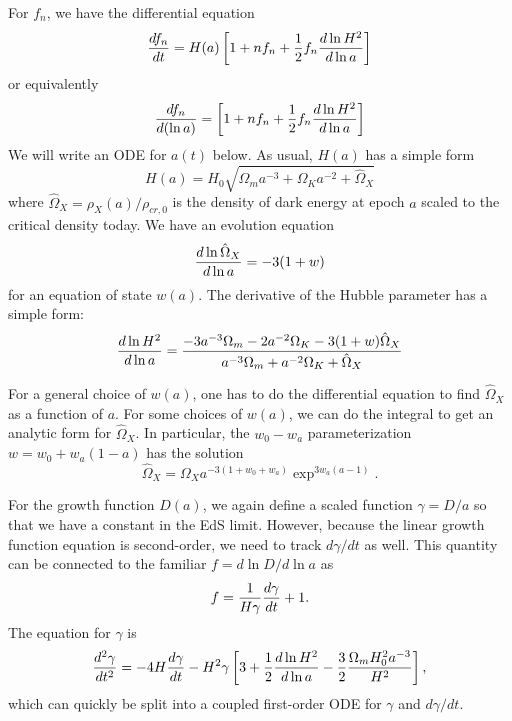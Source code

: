 \documentclass[11pt,preprint]{aastex}
\begin{document}
For $f_n$, we have the differential equation 
\begin{equation}
{df_n\over dt} = H(a)\left[1+nf_n + {1\over 2}f_n {d\ln H^2\over d\ln a}\right]
\end{equation}
or equivalently
\begin{equation}
{df_n\over d(\ln a)} = \left[1+nf_n + {1\over 2}f_n {d\ln H^2\over d\ln a}\right]
\end{equation}
We will write an ODE for $a(t)$ below.  As usual, $H(a)$ has a 
simple form
\begin{equation}
H(a) = H_0 \sqrt{ \Omega_m a^{-3} + \Omega_K a^{-2} + \hat\Omega_X }
\end{equation}
where $\hat\Omega_X = \rho_X(a)/\rho_{cr,0}$ is the density of dark
energy at epoch $a$ scaled to the critical density today.  We have
an evolution equation
\begin{equation}
{d\ln\hat\Omega_X\over d\ln a} = -3(1+w)
\end{equation}
for an equation of state $w(a)$.  
The derivative of the Hubble parameter has a simple form:
\begin{equation}
{d \ln H^2\over d\ln a} = { -3a^{-3}\Omega_m -2 a^{-2} \Omega_K -3(1+w) \hat\Omega_X
\over a^{-3}\Omega_m + a^{-2} \Omega_K + \hat\Omega_X}
\end{equation}

For a general choice of $w(a)$, one has to do the differential equation to
find $\hat\Omega_X$ as a function of $a$.
For some choices of $w(a)$, we
can do the integral to get an analytic form for $\hat\Omega_X$.
In particular, the $w_0-w_a$ parameterization $w = w_0+w_a(1-a)$ has the 
solution
\begin{equation}
\hat\Omega_X = \Omega_X a^{-3(1+w_0+w_a)} \exp^{3w_a(a-1)}.
\end{equation}

\bigskip

For the growth function $D(a)$, we again define a scaled function $\gamma = D/a$
so that we have a constant in the EdS limit.  However, because the linear
growth function equation is second-order, we need to track $d\gamma/dt$
as well.  This quantity can be connected to the familiar $f = d\ln D/d\ln a$
as 
\begin{equation}
f = {1\over H\gamma}{d\gamma\over dt} +1.
\end{equation}
The equation for $\gamma$ is 
\begin{equation}
{d^2\gamma\over dt^2} = -4H{d\gamma\over dt} - H^2\gamma
\left[ 3 + {1\over2}{d\ln H^2\over d\ln a} - {3\over 2} {\Omega_m H_0^2 a^{-3}\over H^2}
\right],
\end{equation}
which can quickly be split into a coupled first-order ODE for $\gamma$ and 
$d\gamma/dt$.
\end{document}

